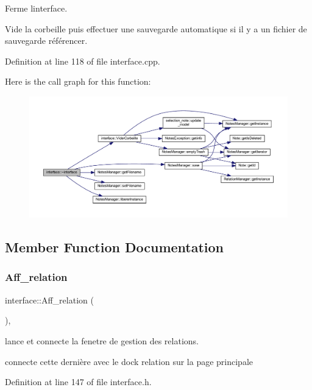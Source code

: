 Ferme l\textquotesingle{}interface. 

Vide la corbeille puis effectuer une sauvegarde automatique si il y a un fichier de sauvegarde référencer. 

Definition at line 118 of file interface.\+cpp.

Here is the call graph for this function\+:\nopagebreak
\begin{figure}[H]
\begin{center}
\leavevmode
\includegraphics[width=350pt]{classinterface_a8511f28c5bc5d3c24a24e9aaef4db502_cgraph}
\end{center}
\end{figure}


\subsection{Member Function Documentation}
\mbox{\label{classinterface_a287c8a46ece12a94540a190b96b911c9}} 
\subsubsection{\texorpdfstring{Aff\+\_\+relation}{Aff\_relation}}
{\footnotesize\ttfamily interface\+::\+Aff\+\_\+relation (\begin{DoxyParamCaption}{ }\end{DoxyParamCaption})\hspace{0.3cm}{\ttfamily [inline]}, {\ttfamily [slot]}}



lance et connecte la fenetre de gestion des relations. 

connecte cette dernière avec le dock relation sur la page principale 

Definition at line 147 of file interface.\+h.

